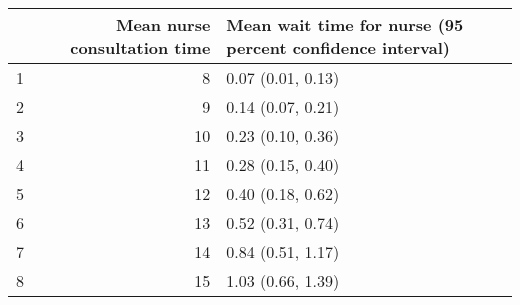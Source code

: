 \begin{table}[ht]
\centering
\begin{tabular}{rrl}
  \hline
 & Mean nurse consultation time & Mean wait time for nurse (95 percent confidence interval) \\ 
  \hline
1 &   8 & 0.07 (0.01, 0.13) \\ 
  2 &   9 & 0.14 (0.07, 0.21) \\ 
  3 &  10 & 0.23 (0.10, 0.36) \\ 
  4 &  11 & 0.28 (0.15, 0.40) \\ 
  5 &  12 & 0.40 (0.18, 0.62) \\ 
  6 &  13 & 0.52 (0.31, 0.74) \\ 
  7 &  14 & 0.84 (0.51, 1.17) \\ 
  8 &  15 & 1.03 (0.66, 1.39) \\ 
   \hline
\end{tabular}
\end{table}
